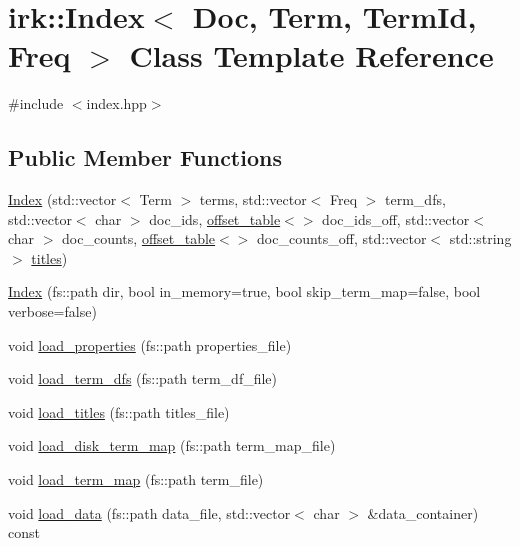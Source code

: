 \hypertarget{classirk_1_1Index}{}\section{irk\+:\+:Index$<$ Doc, Term, Term\+Id, Freq $>$ Class Template Reference}
\label{classirk_1_1Index}


{\ttfamily \#include $<$index.\+hpp$>$}

\subsection*{Public Member Functions}
\begin{DoxyCompactItemize}
\item 
\mbox{\hyperlink{classirk_1_1Index_a2f39a24037a6bfd1045e1d72ef00efa5}{Index}} (std\+::vector$<$ Term $>$ terms, std\+::vector$<$ Freq $>$ term\+\_\+dfs, std\+::vector$<$ char $>$ doc\+\_\+ids, \mbox{\hyperlink{classirk_1_1offset__table}{offset\+\_\+table}}$<$$>$ doc\+\_\+ids\+\_\+off, std\+::vector$<$ char $>$ doc\+\_\+counts, \mbox{\hyperlink{classirk_1_1offset__table}{offset\+\_\+table}}$<$$>$ doc\+\_\+counts\+\_\+off, std\+::vector$<$ std\+::string $>$ \mbox{\hyperlink{classirk_1_1Index_afb307eea8951d7915c19e411ef31ba65}{titles}})
\item 
\mbox{\hyperlink{classirk_1_1Index_a389b4576226ef4168d659de27ce220cb}{Index}} (fs\+::path dir, bool in\+\_\+memory=true, bool skip\+\_\+term\+\_\+map=false, bool verbose=false)
\item 
void \mbox{\hyperlink{classirk_1_1Index_a4d6432c69c4b40878eb37d3a4d9d7498}{load\+\_\+properties}} (fs\+::path properties\+\_\+file)
\item 
void \mbox{\hyperlink{classirk_1_1Index_ae3a25d8b3bba2191ad2010317e83ebae}{load\+\_\+term\+\_\+dfs}} (fs\+::path term\+\_\+df\+\_\+file)
\item 
void \mbox{\hyperlink{classirk_1_1Index_a83376b5f0eeb64a0fad76ac594c44966}{load\+\_\+titles}} (fs\+::path titles\+\_\+file)
\item 
void \mbox{\hyperlink{classirk_1_1Index_a20b301f9bb276d04a86f2c8c72ade2ae}{load\+\_\+disk\+\_\+term\+\_\+map}} (fs\+::path term\+\_\+map\+\_\+file)
\item 
void \mbox{\hyperlink{classirk_1_1Index_a0fe8e303bff128d44979a2d2424fbfd0}{load\+\_\+term\+\_\+map}} (fs\+::path term\+\_\+file)
\item 
void \mbox{\hyperlink{classirk_1_1Index_a71c41b09c956bb2ba3b0c303ce81ec0e}{load\+\_\+data}} (fs\+::path data\+\_\+file, std\+::vector$<$ char $>$ \&data\+\_\+container) const

\end{DoxyCompactItemize}
